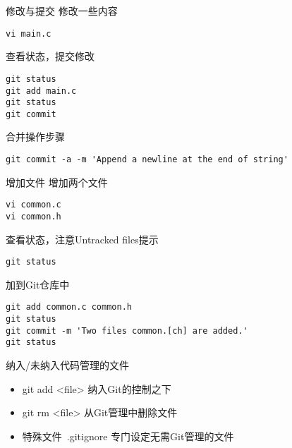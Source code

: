 \begin{frame}[<+->][fragile]{修改与提交}
\onslide<+->
修改一些内容
\begin{Verbatim}[frame=single,commandchars=\\\{\}]
vi main.c
\end{Verbatim}

\onslide<+->
查看状态，提交修改
\begin{Verbatim}[frame=single,commandchars=\\\{\}]
git status
git add main.c
git status
git commit
\end{Verbatim}

\onslide<+->
合并操作步骤
\begin{Verbatim}[frame=single,commandchars=\\\{\}]
git commit -a -m 'Append a newline at the end of string'
\end{Verbatim}
\end{frame}

\begin{frame}[<+->][fragile]{增加文件}
\onslide<+->
增加两个文件
\begin{Verbatim}[frame=single,commandchars=\\\{\}]
vi common.c
vi common.h
\end{Verbatim}

\onslide<+->
查看状态，注意Untracked files提示
\begin{Verbatim}[frame=single,commandchars=\\\{\}]
git status
\end{Verbatim}

\onslide<+->
加到Git仓库中
\begin{Verbatim}[frame=single,commandchars=\\\{\}]
git add common.c common.h
git status
git commit -m 'Two files common.[ch] are added.'
git status
\end{Verbatim}
\end{frame}

\begin{frame}[<+->]{纳入/未纳入代码管理的文件}
  \begin{itemize}
    \item git add <file> 纳入Git的控制之下
    \item git rm <file> 从Git管理中删除文件
    \item 特殊文件\  .gitignore 专门设定无需Git管理的文件
  \end{itemize}
\end{frame}


